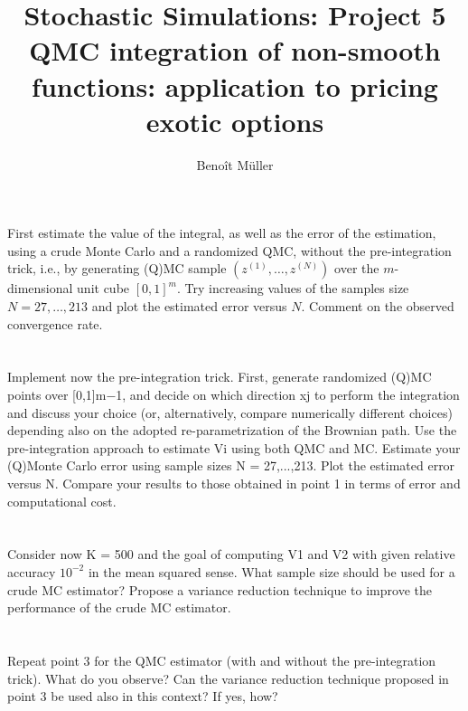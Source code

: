 \documentclass[a4paper]{article}
\title{Stochastic Simulations: Project 5 \\
\bf{QMC integration of non-smooth functions: application to pricing exotic options} }
\author{Benoît Müller}
\theoremstyle{definition}
\theoremstyle{remark}
\begin{document}
\maketitle
\part{}
First estimate the value of the integral, as well as the error of the estimation, using a crude Monte Carlo and a randomized QMC, without the pre-integration trick, i.e., by generating (Q)MC sample $(z^{(1)},\dots, z^{(N)})$ over the $m$-dimensional unit cube $[0, 1]^m$. Try increasing values of the samples size $N = 27,\dots, 213$ and plot the estimated error versus $N$. Comment on the observed convergence rate.
\part{}
Implement now the pre-integration trick. First, generate randomized (Q)MC points over [0,1]m−1, and decide on which direction xj to perform the integration and discuss your choice (or, alternatively, compare numerically different choices) depending also on the adopted re-parametrization of the Brownian path. Use the pre-integration approach to estimate Vi using both QMC and MC. Estimate your (Q)Monte Carlo error using sample sizes N = 27,...,213. Plot the estimated error versus N. Compare your results to those obtained in point 1 in terms of error and computational cost.
\part{}
Consider now K = 500 and the goal of computing V1 and V2 with given relative accuracy $10^{−2}$ in the mean squared sense. What sample size should be used for a crude MC estimator? Propose a variance reduction technique to improve the performance of the crude MC estimator.
\part{}
Repeat point 3 for the QMC estimator (with and without the pre-integration trick). What do you observe? Can the variance reduction technique proposed in point 3 be used also in this context? If yes, how?
\end{document}
